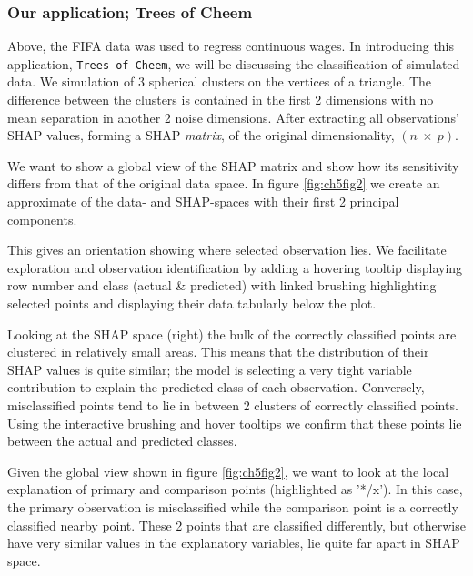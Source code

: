 \documentclass{template/monashthesis}
\begin{document}
\hypertarget{our-application-trees-of-cheem}{%
\subsubsection{Our application; Trees of Cheem}\label{our-application-trees-of-cheem}}

Above, the FIFA data was used to regress continuous wages. In introducing this application, \texttt{Trees\ of\ Cheem}, we will be discussing the classification of simulated data. We simulation of 3 spherical clusters on the vertices of a triangle. The difference between the clusters is contained in the first 2 dimensions with no mean separation in another 2 noise dimensions. After extracting all observations' SHAP values, forming a SHAP \emph{matrix}, of the original dimensionality, \((n~\times~p)\).

We want to show a global view of the SHAP matrix and show how its sensitivity differs from that of the original data space. In figure \ref{fig:ch5fig2} we create an approximate of the data- and SHAP-spaces with their first 2 principal components.

This gives an orientation showing where selected observation lies. We facilitate exploration and observation identification by adding a hovering tooltip displaying row number and class (actual \& predicted) with linked brushing highlighting selected points and displaying their data tabularly below the plot.

Looking at the SHAP space (right) the bulk of the correctly classified points are clustered in relatively small areas. This means that the distribution of their SHAP values is quite similar; the model is selecting a very tight variable contribution to explain the predicted class of each observation. Conversely, misclassified points tend to lie in between 2 clusters of correctly classified points. Using the interactive brushing and hover tooltips we confirm that these points lie between the actual and predicted classes.

Given the global view shown in figure \ref{fig:ch5fig2}, we want to look at the local explanation of primary and comparison points (highlighted as '*/x'). In this case, the primary observation is misclassified while the comparison point is a correctly classified nearby point. These 2 points that are classified differently, but otherwise have very similar values in the explanatory variables, lie quite far apart in SHAP space.
\end{document}
